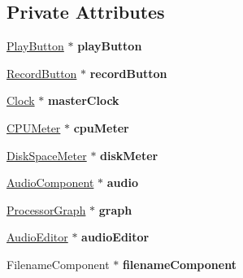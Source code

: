 \subsection*{Private Attributes}
\begin{DoxyCompactItemize}
\item 
\hypertarget{classControlPanel_a4b9a83ab762f1a58ab247957dc58af12}{\hyperlink{classPlayButton}{Play\-Button} $\ast$ {\bfseries play\-Button}}\label{classControlPanel_a4b9a83ab762f1a58ab247957dc58af12}

\item 
\hypertarget{classControlPanel_aedab407279cbe739c3790699d4a46dd0}{\hyperlink{classRecordButton}{Record\-Button} $\ast$ {\bfseries record\-Button}}\label{classControlPanel_aedab407279cbe739c3790699d4a46dd0}

\item 
\hypertarget{classControlPanel_aeebb097e70665b1b487c9e0737da9c34}{\hyperlink{classClock}{Clock} $\ast$ {\bfseries master\-Clock}}\label{classControlPanel_aeebb097e70665b1b487c9e0737da9c34}

\item 
\hypertarget{classControlPanel_a6a532ba0667e6b160caccdeede3c32a4}{\hyperlink{classCPUMeter}{C\-P\-U\-Meter} $\ast$ {\bfseries cpu\-Meter}}\label{classControlPanel_a6a532ba0667e6b160caccdeede3c32a4}

\item 
\hypertarget{classControlPanel_ac6f45060580dba90914049dd6c84e599}{\hyperlink{classDiskSpaceMeter}{Disk\-Space\-Meter} $\ast$ {\bfseries disk\-Meter}}\label{classControlPanel_ac6f45060580dba90914049dd6c84e599}

\item 
\hypertarget{classControlPanel_ad38ee9953ba8d4d3cbbbf418547ac805}{\hyperlink{classAudioComponent}{Audio\-Component} $\ast$ {\bfseries audio}}\label{classControlPanel_ad38ee9953ba8d4d3cbbbf418547ac805}

\item 
\hypertarget{classControlPanel_aee34c7466b14f0fe02623237c679cc96}{\hyperlink{classProcessorGraph}{Processor\-Graph} $\ast$ {\bfseries graph}}\label{classControlPanel_aee34c7466b14f0fe02623237c679cc96}

\item 
\hypertarget{classControlPanel_ae094b5ddde0916feaef4af9d9c2b7517}{\hyperlink{classAudioEditor}{Audio\-Editor} $\ast$ {\bfseries audio\-Editor}}\label{classControlPanel_ae094b5ddde0916feaef4af9d9c2b7517}

\item 
\hypertarget{classControlPanel_a41c64ea3f778a3779d1779c6acb1baec}{Filename\-Component $\ast$ {\bfseries filename\-Component}}\label{classControlPanel_a41c64ea3f778a3779d1779c6acb1baec}


\end{DoxyCompactItemize}
